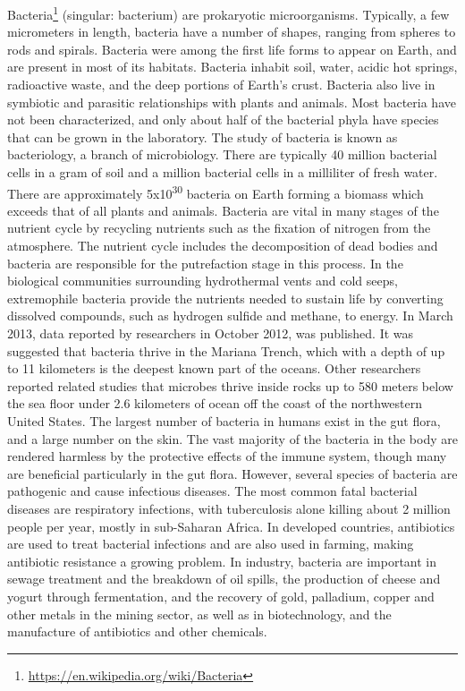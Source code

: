 \documentclass[]{book}
\let\rmarkdownfootnote\footnote%
\def\footnote{\protect\rmarkdownfootnote}
\renewcommand{\href}[2]{#2\footnote{\url{#1}}}
\begin{document}
\href{https://en.wikipedia.org/wiki/Bacteria}{Bacteria} (singular: bacterium) are prokaryotic microorganisms. Typically, a few micrometers in length, bacteria have a number of shapes, ranging from spheres to rods and spirals. Bacteria were among the first life forms to appear on Earth, and are present in most of its habitats. Bacteria inhabit soil, water, acidic hot springs, radioactive waste, and the deep portions of Earth's crust. Bacteria also live in symbiotic and parasitic relationships with plants and animals. Most bacteria have not been characterized, and only about half of the bacterial phyla have species that can be grown in the laboratory. The study of bacteria is known as bacteriology, a branch of microbiology.
There are typically 40 million bacterial cells in a gram of soil and a million bacterial cells in a milliliter of fresh water. There are approximately 5x10\textsuperscript{30} bacteria on Earth forming a biomass which exceeds that of all plants and animals. Bacteria are vital in many stages of the nutrient cycle by recycling nutrients such as the fixation of nitrogen from the atmosphere. The nutrient cycle includes the decomposition of dead bodies and bacteria are responsible for the putrefaction stage in this process. In the biological communities surrounding hydrothermal vents and cold seeps, extremophile bacteria provide the nutrients needed to sustain life by converting dissolved compounds, such as hydrogen sulfide and methane, to energy. In March 2013, data reported by researchers in October 2012, was published. It was suggested that bacteria thrive in the Mariana Trench, which with a depth of up to 11 kilometers is the deepest known part of the oceans. Other researchers reported related studies that microbes thrive inside rocks up to 580 meters below the sea floor under 2.6 kilometers of ocean off the coast of the northwestern United States.
The largest number of bacteria in humans exist in the gut flora, and a large number on the skin. The vast majority of the bacteria in the body are rendered harmless by the protective effects of the immune system, though many are beneficial particularly in the gut flora. However, several species of bacteria are pathogenic and cause infectious diseases. The most common fatal bacterial diseases are respiratory infections, with tuberculosis alone killing about 2 million people per year, mostly in sub-Saharan Africa. In developed countries, antibiotics are used to treat bacterial infections and are also used in farming, making antibiotic resistance a growing problem. In industry, bacteria are important in sewage treatment and the breakdown of oil spills, the production of cheese and yogurt through fermentation, and the recovery of gold, palladium, copper and other metals in the mining sector, as well as in biotechnology, and the manufacture of antibiotics and other chemicals.
\end{document}
